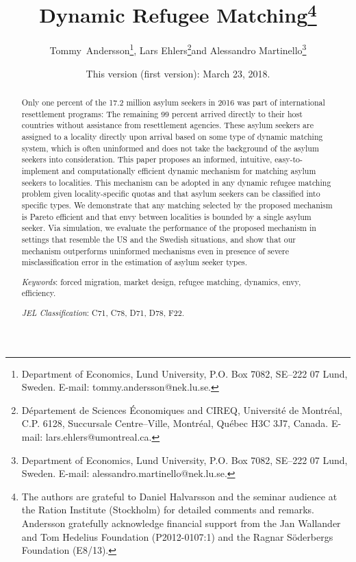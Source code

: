 \documentclass[12pt,fleqn]{article}
\begin{document}
\title{\textbf{Dynamic Refugee Matching}\footnote{The authors are grateful to Daniel Halvarsson and the seminar audience at the Ration Institute (Stockholm) for detailed comments and remarks. Andersson gratefully acknowledge financial support from the Jan Wallander and Tom Hedelius Foundation (P2012-0107:1) and the Ragnar S\"oderbergs Foundation (E8/13).}}

\author{Tommy~Andersson\footnote{Department of Economics, Lund University, P.O. Box 7082, SE--222 07 Lund, Sweden. E-mail: tommy.andersson@nek.lu.se.}, Lars Ehlers\footnote{D\'epartement de Sciences \'Economiques and CIREQ, Universit\'e de Montr\'eal, C.P. 6128, Succursale Centre--Ville, Montr\'eal, Qu\'ebec H3C
3J7, Canada. E-mail: lars.ehlers@umontreal.ca.}\space\space and Alessandro Martinello\footnote{Department of Economics, Lund University, P.O. Box 7082, SE--222 07 Lund, Sweden. E-mail: alessandro.martinello@nek.lu.se.}}

\date{\small{This version (first version): March 23, 2018.}}

\maketitle
\vspace*{-4mm}
\begin{abstract}
\noindent Only one percent of the 17.2 million asylum seekers in 2016 was part of international resettlement programs: The remaining 99 percent arrived directly to their host countries without assistance from resettlement agencies. These asylum seekers are assigned to a locality directly upon arrival based on some type of dynamic matching system, which is often uninformed and does not take the background of the asylum seekers into consideration. This paper proposes an informed, intuitive, easy-to-implement and computationally efficient dynamic mechanism for matching asylum seekers to localities. This mechanism can be adopted in any dynamic refugee matching problem given locality-specific quotas and that asylum seekers can be classified into specific types. We demonstrate that any matching selected by the proposed mechanism is Pareto efficient and that envy between localities is bounded by a single asylum seeker. Via simulation, we evaluate the performance of the proposed mechanism in settings that resemble the US and the Swedish situations, and show that our mechanism outperforms uninformed mechanisms even in presence of severe misclassification error in the estimation of asylum seeker types.

\medskip

\noindent\emph{Keywords}: forced migration, market design, refugee matching, dynamics, envy, efficiency.

\medskip

\noindent\emph{JEL Classification}: C71, C78, D71, D78, F22.

\end{abstract}
\end{document}
